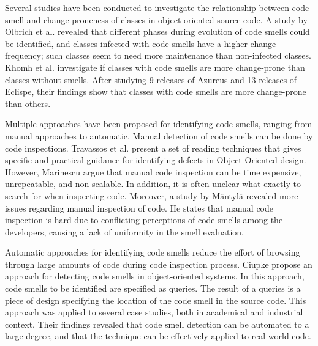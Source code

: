 Several studies have been conducted to investigate the relationship between code smell and change-proneness of classes in object-oriented source code. A study by Olbrich et al.\cite{olbrich2009evolution} revealed that different phases during evolution of code smells could be identified, and classes infected with code smells have a higher change frequency; such classes seem to need more maintenance than non-infected classes. Khomh et al.\cite{khomh2009exploratory} investigate if classes with code smells are more change-prone than classes without smells. After studying 9 releases of Azureus and 13 releases of Eclispe, their findings show that classes with code smells are more change-prone than others.

Multiple approaches have been proposed for identifying code smells, ranging from manual approaches to automatic. Manual detection of code smells can be done by code inspections\cite{travassos1999detecting}. Travassos et al.\cite{travassos1999detecting} present a set of reading techniques that gives specific and practical guidance for identifying defects in Object-Oriented design. However, Marinescu\cite{marinescu2001detecting} argue that manual code inspection can be time expensive, unrepeatable, and non-scalable. In addition, it is often unclear what exactly to search for when inspecting code\cite{ciupke1999automatic}. Moreover, a study by Mäntylä revealed more issues regarding manual inspection of code. He states that manual code inspection is hard due to conflicting perceptions of code smells among the developers, causing a lack of uniformity in the smell evaluation. 

Automatic approaches for identifying code smells reduce the effort of browsing through large amounts of code during code inspection process. Ciupke\cite{ciupke1999automatic} propose an approach for detecting code smells in object-oriented systems. In this approach, code smells to be identified are specified as queries. The result of a queries is a piece of design specifying the location of the code smell in the source code. This approach was applied to several case studies, both in academical and industrial context. Their findings revealed that code smell detection can be automated to a large degree, and that the technique can be effectively applied to real-world code.

